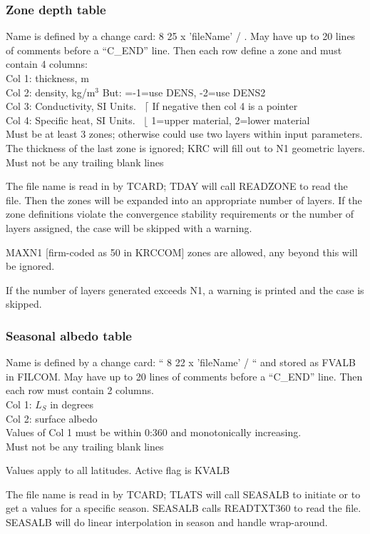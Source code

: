 \documentclass{article}
\newcommand{\qi}{\\ \hspace*{2.em}}      %
\begin{document}
\subsubsection{Zone depth table}
Name is defined by a change card: 8 25 x 'fileName' / . May have up to 20 lines
of comments before a ``C_END'' line. Then each row define a zone and must
contain 4 columns:
\qi Col 1: thickness, m
\qi Col 2: density, kg/m$^3$ \hspace{2.0 cm} But: =-1=use DENS, -2=use DENS2
\qi Col 3: Conductivity, SI Units. \ $\lceil$   If negative then col 4 is a pointer
\qi Col 4: Specific heat, SI Units. \  $\lfloor$  1=upper material, 2=lower material
\\ Must be at least 3 zones; otherwise could use two layers within input parameters. 
\\ The thickness of the last zone is ignored; KRC will fill out to N1 geometric layers.
\\ Must not be any trailing blank lines

The file name is read in by TCARD; TDAY will call READZONE to read the
file. Then the zones will be expanded into an appropriate number of layers. If
the zone definitions violate the convergence stability requirements or the
number of layers assigned, the case will be skipped with a warning.

MAXN1 [firm-coded as 50 in KRCCOM] zones are allowed, any beyond this will be
ignored.

If the number of layers generated exceeds N1, a warning is printed and the case
is skipped.

\subsubsection{Seasonal albedo table}
Name is defined by a change card: `` 8 22 x 'fileName' / `` and stored as FVALB
in FILCOM. May have up to 20 lines of comments before a ``C_END'' line. Then
each row must contain 2 columns.
\qi Col 1: $L_S$ in degrees
\qi Col 2: surface albedo
\\ Values of Col 1 must be within 0:360 and monotonically increasing. 
\qi Must not be any trailing blank lines

Values apply to all latitudes. Active flag is KVALB

The file name is read in by TCARD; TLATS will call SEASALB to initiate or to get
a values for a specific season. SEASALB calls READTXT360 to read the
file. SEASALB will do linear interpolation in season and handle wrap-around.
\end{document}
